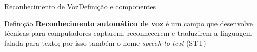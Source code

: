 \begin{frame}[t]{Reconhecimento de Voz}{Definição e componentes}

\begin{block}{Definição}
\textbf{Reconhecimento automático de voz} é um campo que desenvolve técnicas para computadores captarem, reconhecerem e traduzirem a linguagem falada para texto; por isso também o nome \textit{speech to text} (STT)
\end{block}




\end{frame}


